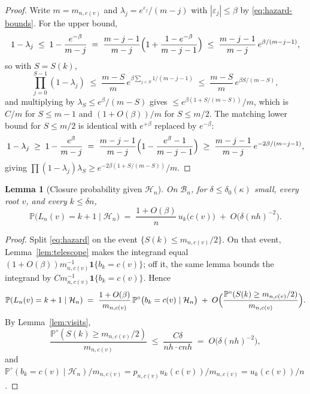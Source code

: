 \documentclass[11pt]{article}
\newcommand{\Prob}{\mathbb{P}}
\newcommand{\1}{\mathbf{1}}
\newcommand{\eps}{\varepsilon}
\newcommand{\cB}{\mathcal{B}}
\newcommand{\cH}{\mathcal{H}}
\newtheorem{lemma}[theorem]{Lemma}
\theoremstyle{remark}
\begin{document}
\begin{proof}
Write $m=m_{n,c(v)}$ and $\lambda_j=e^{\eps_j}/(m-j)$ with
$|\eps_j|\le\beta$ by \eqref{eq:hazard-bounds}. For the upper bound,
\[
1-\lambda_j\;\le\;1-\frac{e^{-\beta}}{m-j}
\;=\;\frac{m-j-1}{m-j}\Bigl(1+\frac{1-e^{-\beta}}{m-j-1}\Bigr)
\;\le\;\frac{m-j-1}{m-j}\,e^{\beta/(m-j-1)},
\]
so with $S=S(k)$,
\[
\prod_{j=0}^{S-1}(1-\lambda_j)\;\le\;
\frac{m-S}{m}\,e^{\beta\sum_{j<S}1/(m-j-1)}
\;\le\;\frac{m-S}{m}\,e^{\beta S/(m-S)},
\]
and multiplying by $\lambda_S\le e^{\beta}/(m-S)$ gives
$\le e^{\beta(1+S/(m-S))}/m$, which is $C/m$ for $S\le m-1$ and
$(1+O(\beta))/m$ for $S\le m/2$. The matching lower bound for $S\le m/2$ is
identical with $e^{+\beta}$ replaced by $e^{-\beta}$:
\[
1-\lambda_j\;\ge\;1-\frac{e^{\beta}}{m-j}
\;=\;\frac{m-j-1}{m-j}\Bigl(1-\frac{e^{\beta}-1}{m-j-1}\Bigr)
\;\ge\;\frac{m-j-1}{m-j}\,e^{-2\beta/(m-j-1)},
\]
giving $\prod(1-\lambda_j)\lambda_S\ge e^{-2\beta(1+S/(m-S))}/m$.
\end{proof}

\begin{lemma}[Closure probability given $\cH_n$]\label{lem:closure}
On $\cB_n$, for $\delta\le\delta_0(\kappa)$ small, every root $v$, and every
$k\le\delta n$,
\begin{equation}\label{eq:closure}
\Prob\bigl(L_n(v)=k+1\mid\cH_n\bigr)
\;=\;\frac{1+O(\beta)}{n}\,u_k\bigl(c(v)\bigr)
\;+\;O\bigl(\delta(nh)^{-2}\bigr).
\end{equation}
\end{lemma}

\begin{proof}
Split \eqref{eq:hazard} on the event $\{S(k)\le m_{n,c(v)}/2\}$. On that
event, Lemma~\ref{lem:telescope} makes the integrand equal
$(1+O(\beta))m_{n,c(v)}^{-1}\1\{b_k=c(v)\}$; off it, the same lemma bounds
the integrand by $Cm_{n,c(v)}^{-1}\1\{b_k=c(v)\}$. Hence
\[
\Prob(L_n(v)=k+1\mid\cH_n)
\;=\;\frac{1+O(\beta)}{m_{n,c(v)}}\,
\Prob^\circ\bigl(b_k=c(v)\mid\cH_n\bigr)
\;+\;O\Bigl(\frac{\Prob^\circ(S(k)\ge m_{n,c(v)}/2)}{m_{n,c(v)}}\Bigr).
\]
By Lemma~\ref{lem:visits},
\[
\frac{\Prob^\circ(S(k)\ge m_{n,c(v)}/2)}{m_{n,c(v)}}
\;\le\;\frac{C\delta}{nh\cdot cnh}
\;=\;O\bigl(\delta(nh)^{-2}\bigr),
\]
and $\Prob^\circ(b_k=c(v)\mid\cH_n)/m_{n,c(v)}
=p_{n,c(v)}u_k(c(v))/m_{n,c(v)}=u_k(c(v))/n$.
\end{proof}
\end{document}
